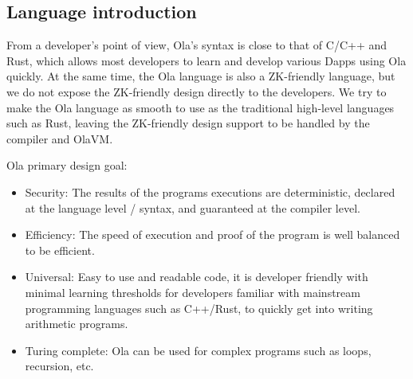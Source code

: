 \subsection{Language introduction}\label{section: ola-lang-language-introduction}

From a developer’s point of view, Ola’s syntax is close to that of C/C++ and Rust, which allows most developers to learn and develop various Dapps using Ola quickly.
At the same time, the Ola language is also a ZK-friendly language, but we do not expose the ZK-friendly design directly to the developers.
We try to make the Ola language as smooth to use as the traditional high-level languages such as Rust, leaving the ZK-friendly design support to be handled by the compiler and OlaVM.

Ola primary design goal:

    \begin{itemize}
        \item Security: The results of the programs executions are deterministic, declared at the language level / syntax, and guaranteed at the compiler level.

        \item Efficiency: The speed of execution and proof of the program is well balanced to be efficient.

        \item Universal: Easy to use and readable code, it is developer friendly with minimal learning thresholds for developers familiar with mainstream programming languages such as C++/Rust, to quickly get into writing arithmetic programs.

        \item Turing complete: Ola can be used for complex programs such as loops, recursion, etc.
    \end{itemize}
